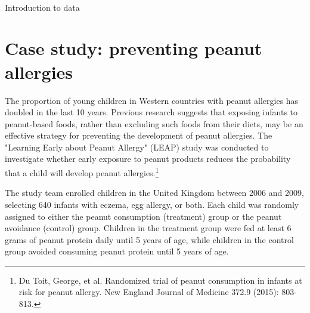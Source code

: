 \ \textD{\newpage}

\begin{chapterpage}{Introduction to data}
  \label{introductionToData}
\end{chapterpage}
\renewcommand{\chapterfolder}{ch_intro_to_data}




\section[Case study]{Case study: preventing peanut allergies}
\label{leapCaseStudy}


The proportion of young children in Western countries with peanut allergies has doubled in the last 10 years. Previous research suggests that exposing infants to peanut-based foods, rather than excluding such foods from their diets, may be an effective strategy for preventing the development of peanut allergies. The "Learning Early about Peanut Allergy" (LEAP) study was conducted to investigate whether early exposure to peanut products reduces the probability that a child will develop peanut allergies.\footnote{Du Toit, George, et al. Randomized trial of peanut consumption in infants at risk for peanut allergy. New England Journal of Medicine 372.9 (2015): 803-813.}

The study team enrolled children in the United Kingdom between 2006 and 2009, selecting 640 infants with eczema, egg allergy, or both. Each child was randomly assigned to either the peanut consumption (treatment) group or the peanut avoidance (control) group. Children in the treatment group were fed at least 6 grams of peanut protein daily until 5 years of age, while children in the control group avoided consuming peanut protein until 5 years of age.

